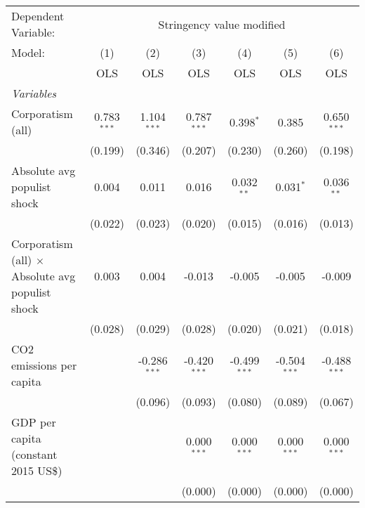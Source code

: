 
\begingroup
\centering
\begin{tabular}{lcccccc}
   \toprule
   Dependent Variable: & \multicolumn{6}{c}{Stringency value modified}\\
   Model:                                                  & (1)           & (2)            & (3)            & (4)            & (5)            & (6)\\  
                                                           &  OLS          & OLS            & OLS            & OLS            & OLS            & OLS\\  
   \midrule
   \emph{Variables}\\
   Corporatism (all)                                       & 0.783$^{***}$ & 1.104$^{***}$  & 0.787$^{***}$  & 0.398$^{*}$    & 0.385          & 0.650$^{***}$\\   
                                                           & (0.199)       & (0.346)        & (0.207)        & (0.230)        & (0.260)        & (0.198)\\   
   Absolute avg populist shock                             & 0.004         & 0.011          & 0.016          & 0.032$^{**}$   & 0.031$^{*}$    & 0.036$^{**}$\\   
                                                           & (0.022)       & (0.023)        & (0.020)        & (0.015)        & (0.016)        & (0.013)\\   
   Corporatism (all) $\times$ Absolute avg populist shock  & 0.003         & 0.004          & -0.013         & -0.005         & -0.005         & -0.009\\   
                                                           & (0.028)       & (0.029)        & (0.028)        & (0.020)        & (0.021)        & (0.018)\\   
   CO2 emissions per capita                                &               & -0.286$^{***}$ & -0.420$^{***}$ & -0.499$^{***}$ & -0.504$^{***}$ & -0.488$^{***}$\\   
                                                           &               & (0.096)        & (0.093)        & (0.080)        & (0.089)        & (0.067)\\   
   GDP per capita (constant 2015 US\$)                     &               &                & 0.000$^{***}$  & 0.000$^{***}$  & 0.000$^{***}$  & 0.000$^{***}$\\   
                                                           &               &                & (0.000)        & (0.000)        & (0.000)        & (0.000)\\   

\end{tabular}
